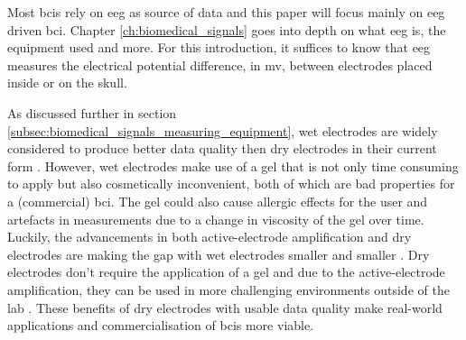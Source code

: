 Most \glspl{bci} rely on \gls{eeg} as source of data and this paper will focus mainly on \gls{eeg} driven \gls{bci}.
Chapter \ref{ch:biomedical_signals} goes into depth on what \gls{eeg} is, the equipment used and more.
For this introduction, it suffices to know that \gls{eeg} measures the electrical potential difference, in \gls{mv}, between electrodes placed inside or on the skull.

As discussed further in section \ref{subsec:biomedical_signals_measuring_equipment}, wet electrodes are widely considered to produce better data quality then dry electrodes in their current form \citep{wet_vs_dry, dry_electrode_status, wet_dry_comparison_experiment}.
However, wet electrodes make use of a gel that is not only time consuming to apply but also cosmetically inconvenient, both of which are bad properties for a (commercial) \gls{bci}.
The gel could also cause allergic effects for the user and artefacts in measurements due to a change in viscosity of the gel over time.
Luckily, the advancements in both active-electrode amplification and dry electrodes are making the gap with wet electrodes smaller and smaller \citep{wet_vs_dry, dry_electrode_status, wet_dry_comparison_experiment}.
Dry electrodes don't require the application of a gel and due to the active-electrode amplification, they can be used in more challenging environments outside of the lab \citep{wet_vs_dry}.
These benefits of dry electrodes with usable data quality make real-world applications and commercialisation of \glspl{bci} more viable.

